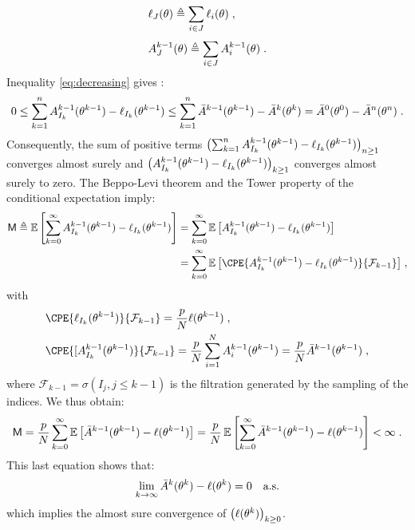 \documentclass[11pt]{article}
\theoremstyle{plain}
\begin{document}
\begin{align}\label{batchnotation}
& \ell_{J}(\theta) \triangleq \sum_{i \in J}^{}{\ell_{i}(\theta)}\;,\\
& A^{k-1}_{J}(\theta) \triangleq \sum_{i \in J}^{}{A^{k-1}_{i}(\theta)}\;.
\end{align}
Inequality \eqref{eq:decreasing} gives :
\begin{align}
0 \leq \sum_{k=1}^{n}{A^{k-1}_{I_{k}}(\theta^{k-1}) - \ell_{I_{k}}(\theta^{k-1})} \leq \sum_{k=1}^{n}{ \bar{A}^{k-1}(\theta^{k-1}) - \bar{A}^k(\theta^{k})} =  \bar{A}^{0}(\theta^{0}) - \bar{A}^n(\theta^{n})\;.
\end{align}
Consequently, the sum of positive terms $\left(\sum_{k=1}^{n}{A^{k-1}_{I_{k}}(\theta^{k-1}) - \ell_{I_{k}}(\theta^{k-1})} \right)_{n \geq 1}$ converges almost surely and $\left(A^{k-1}_{I_{k}}(\theta^{k-1}) - \ell_{I_{k}}(\theta^{k-1})\right)_{k\geq1}$ converges almost surely to zero.
The Beppo-Levi theorem and the Tower property of the conditional expectation imply:
\begin{align}\label{Mdeter1}
\mathsf{M} \triangleq \E \left[\sum_{k=0}^{\infty}{A^{k-1}_{I_{k}}(\theta^{k-1}) - \loglike_{I_{k}}(\theta^{k-1})}\right] & = \sum_{k=0}^{\infty}{\E \left[A^{k-1}_{I_{k}}(\theta^{k-1}) - \loglike_{I_{k}}(\theta^{k-1})\right]} \\
& = \sum_{k=0}^{\infty}{\E \left[\CPE{A^{k-1}_{I_{k}}(\theta^{k-1}) - \loglike_{I_{k}}(\theta^{k-1})}{\mathcal{F}_{k-1}} \right]}\eqs,
\end{align}
with 
\begin{align*}
& \CPE{\loglike_{I_{k}}(\theta^{k-1})}{\mathcal{F}_{k-1}} = \frac{p}{N} \loglike(\theta^{k-1}) \eqs,\\
& \CPE{[A^{k-1}_{I_{k}}(\theta^{k-1})}{\mathcal{F}_{k-1}} = \frac{p}{N} \sum_{i=1}^{N}{A^{k-1}_{i}(\theta^{k-1})} = \frac{p}{N}\bar{A}^{k-1}(\theta^{k-1}) \eqs,
\end{align*}
where $\mathcal{F}_{k-1} = \sigma(I_j, j \leq k-1)$ is the filtration generated by the sampling of the indices.
We thus obtain:
\begin{align}\label{Mdeter2}
\mathsf{M} =\frac{p}{N} \sum_{k=0}^{\infty}{\operatorname*{\mathbb{E}} \left[\bar{A}^{k-1}(\theta^{k-1}) - \ell(\theta^{k-1})\right]} = \frac{p}{N} \operatorname*{\mathbb{E}} \left[\sum_{k=0}^{\infty}{\bar{A}^{k-1}(\theta^{k-1}) - \ell(\theta^{k-1})}\right] < \infty \;.
\end{align}
This last equation shows that:
\begin{equation}\label{detergap}
    \lim \limits_{k \to \infty} \bar{A}^{k}(\theta^{k}) - \ell(\theta^{k}) = 0 \quad \textrm{a.s.}
\end{equation}
which implies the almost sure convergence of $\left(\ell(\theta^{k})\right)_{k\geq0}$.
\end{document}
